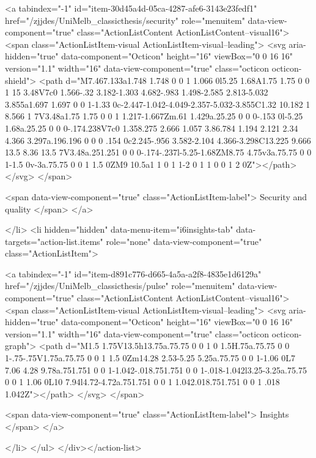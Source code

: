     
    <a tabindex="-1" id="item-30d45a4d-05ca-4287-afe6-3143e23fedf1" href="/zjjdes/UniMelb_classicthesis/security" role="menuitem" data-view-component="true" class="ActionListContent ActionListContent--visual16">
        <span class="ActionListItem-visual ActionListItem-visual--leading">
          <svg aria-hidden="true" data-component="Octicon" height="16" viewBox="0 0 16 16" version="1.1" width="16" data-view-component="true" class="octicon octicon-shield">
    <path d="M7.467.133a1.748 1.748 0 0 1 1.066 0l5.25 1.68A1.75 1.75 0 0 1 15 3.48V7c0 1.566-.32 3.182-1.303 4.682-.983 1.498-2.585 2.813-5.032 3.855a1.697 1.697 0 0 1-1.33 0c-2.447-1.042-4.049-2.357-5.032-3.855C1.32 10.182 1 8.566 1 7V3.48a1.75 1.75 0 0 1 1.217-1.667Zm.61 1.429a.25.25 0 0 0-.153 0l-5.25 1.68a.25.25 0 0 0-.174.238V7c0 1.358.275 2.666 1.057 3.86.784 1.194 2.121 2.34 4.366 3.297a.196.196 0 0 0 .154 0c2.245-.956 3.582-2.104 4.366-3.298C13.225 9.666 13.5 8.36 13.5 7V3.48a.251.251 0 0 0-.174-.237l-5.25-1.68ZM8.75 4.75v3a.75.75 0 0 1-1.5 0v-3a.75.75 0 0 1 1.5 0ZM9 10.5a1 1 0 1 1-2 0 1 1 0 0 1 2 0Z"></path>
</svg>
        </span>
      
        <span data-view-component="true" class="ActionListItem-label">
          Security and quality
</span>      
</a>
  
</li>
        <li hidden="hidden" data-menu-item="i6insights-tab" data-targets="action-list.items" role="none" data-view-component="true" class="ActionListItem">
    
    
    <a tabindex="-1" id="item-d891c776-d665-4a5a-a2f8-4835e1d6129a" href="/zjjdes/UniMelb_classicthesis/pulse" role="menuitem" data-view-component="true" class="ActionListContent ActionListContent--visual16">
        <span class="ActionListItem-visual ActionListItem-visual--leading">
          <svg aria-hidden="true" data-component="Octicon" height="16" viewBox="0 0 16 16" version="1.1" width="16" data-view-component="true" class="octicon octicon-graph">
    <path d="M1.5 1.75V13.5h13.75a.75.75 0 0 1 0 1.5H.75a.75.75 0 0 1-.75-.75V1.75a.75.75 0 0 1 1.5 0Zm14.28 2.53-5.25 5.25a.75.75 0 0 1-1.06 0L7 7.06 4.28 9.78a.751.751 0 0 1-1.042-.018.751.751 0 0 1-.018-1.042l3.25-3.25a.75.75 0 0 1 1.06 0L10 7.94l4.72-4.72a.751.751 0 0 1 1.042.018.751.751 0 0 1 .018 1.042Z"></path>
</svg>
        </span>
      
        <span data-view-component="true" class="ActionListItem-label">
          Insights
</span>      
</a>
  
</li>
</ul>    
</div></action-list>


